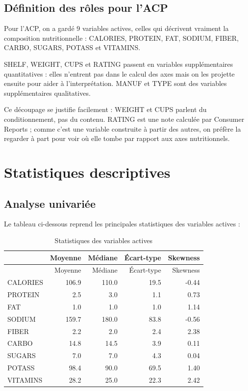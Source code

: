 \documentclass[
]{article}
\begin{document}
\subsection{Définition des rôles pour
l'ACP}\label{duxe9finition-des-roles-pour-lacp}

Pour l'ACP, on a gardé 9 variables actives, celles qui décrivent
vraiment la composition nutritionnelle : CALORIES, PROTEIN, FAT, SODIUM,
FIBER, CARBO, SUGARS, POTASS et VITAMINS.

SHELF, WEIGHT, CUPS et RATING passent en variables supplémentaires
quantitatives : elles n'entrent pas dans le calcul des axes mais on les
projette ensuite pour aider à l'interprétation. MANUF et TYPE sont des
variables supplémentaires qualitatives.

Ce découpage se justifie facilement : WEIGHT et CUPS parlent du
conditionnement, pas du contenu. RATING est une note calculée par
Consumer Reports ; comme c'est une variable construite à partir des
autres, on préfère la regarder à part pour voir où elle tombe par
rapport aux axes nutritionnels.

\section{Statistiques descriptives}\label{statistiques-descriptives}

\subsection{Analyse univariée}\label{analyse-univariuxe9e}

Le tableau ci-dessous reprend les principales statistiques des variables
actives :

\begin{longtable}[]{@{}lrrrr@{}}
\caption{Statistiques des variables actives}\tabularnewline
\toprule\noalign{}
& Moyenne & Médiane & Écart-type & Skewness \\
\midrule\noalign{}
\endfirsthead
\toprule\noalign{}
& Moyenne & Médiane & Écart-type & Skewness \\
\midrule\noalign{}
\endhead
\bottomrule\noalign{}
\endlastfoot
CALORIES & 106.9 & 110.0 & 19.5 & -0.44 \\
PROTEIN & 2.5 & 3.0 & 1.1 & 0.73 \\
FAT & 1.0 & 1.0 & 1.0 & 1.14 \\
SODIUM & 159.7 & 180.0 & 83.8 & -0.56 \\
FIBER & 2.2 & 2.0 & 2.4 & 2.38 \\
CARBO & 14.8 & 14.5 & 3.9 & 0.11 \\
SUGARS & 7.0 & 7.0 & 4.3 & 0.04 \\
POTASS & 98.4 & 90.0 & 69.5 & 1.40 \\
VITAMINS & 28.2 & 25.0 & 22.3 & 2.42 \\
\end{longtable}
\end{document}

